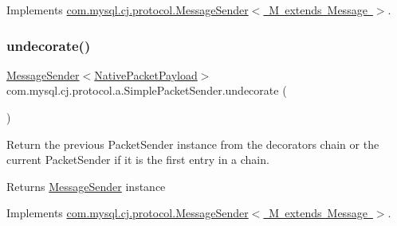 Implements \mbox{\hyperlink{interfacecom_1_1mysql_1_1cj_1_1protocol_1_1_message_sender_a0c7192449eae4aa0f0dbbc9778dac002}{com.\+mysql.\+cj.\+protocol.\+Message\+Sender$<$ M extends Message $>$}}.

\mbox{\label{classcom_1_1mysql_1_1cj_1_1protocol_1_1a_1_1_simple_packet_sender_a7258a5245f263cf4635daba8be258e36}} 
\subsubsection{\texorpdfstring{undecorate()}{undecorate()}}
{\footnotesize\ttfamily \mbox{\hyperlink{interfacecom_1_1mysql_1_1cj_1_1protocol_1_1_message_sender}{Message\+Sender}}$<$\mbox{\hyperlink{classcom_1_1mysql_1_1cj_1_1protocol_1_1a_1_1_native_packet_payload}{Native\+Packet\+Payload}}$>$ com.\+mysql.\+cj.\+protocol.\+a.\+Simple\+Packet\+Sender.\+undecorate (\begin{DoxyParamCaption}{ }\end{DoxyParamCaption})}

Return the previous Packet\+Sender instance from the decorators chain or the current Packet\+Sender if it is the first entry in a chain.

\begin{DoxyReturn}{Returns}
\mbox{\hyperlink{interfacecom_1_1mysql_1_1cj_1_1protocol_1_1_message_sender}{Message\+Sender}} instance 
\end{DoxyReturn}


Implements \mbox{\hyperlink{interfacecom_1_1mysql_1_1cj_1_1protocol_1_1_message_sender_a3a352bf35ad98dc6cea7c1f4ac9480da}{com.\+mysql.\+cj.\+protocol.\+Message\+Sender$<$ M extends Message $>$}}.

\mbox{\label{classcom_1_1mysql_1_1cj_1_1protocol_1_1a_1_1_simple_packet_sender_a2fa36445cf29dff6e32000dc6c95c831}} 

